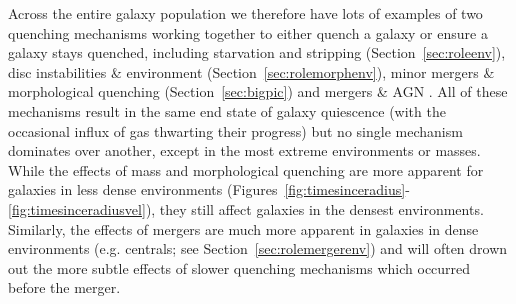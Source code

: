 \documentclass[useAMS,usenatbib]{mn2e}
\begin{document}
Across the entire galaxy population we therefore have lots of examples of two quenching mechanisms working together to either quench a galaxy or ensure a galaxy stays quenched, including starvation and stripping (Section~\ref{sec:roleenv}), disc instabilities \&  environment (Section~\ref{sec:rolemorphenv}), minor mergers \& morphological quenching (Section~\ref{sec:bigpic}) and mergers \& AGN \citep{smethurst15, smethurst16}. All of these mechanisms result in the same end state of galaxy quiescence (with the occasional influx of gas thwarting their progress) but no single mechanism dominates over another, except in the most extreme environments or masses. While the effects of mass and morphological quenching are more apparent for galaxies in less dense environments (Figures~\ref{fig:timesinceradius}-\ref{fig:timesinceradiusvel}), they still affect galaxies in the densest environments. Similarly, the effects of mergers are much more apparent in galaxies in dense environments (e.g. centrals; see Section~\ref{sec:rolemergerenv}) and will often drown out the more subtle effects of slower quenching mechanisms which occurred before the merger. %

\end{document}
